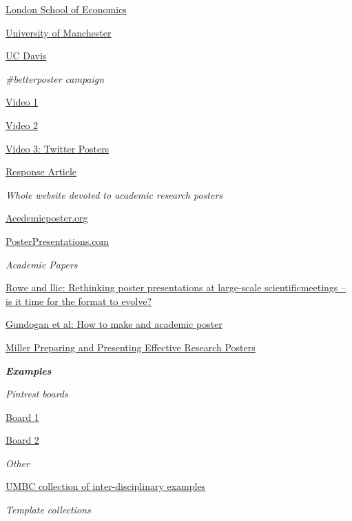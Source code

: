 \documentclass[
]{book}
\begin{document}
\href{https://blogs.lse.ac.uk/impactofsocialsciences/2018/05/11/how-to-design-an-award-winning-conference-poster/}{London School of Economics}

\href{http://www.supi.manchester.ac.uk/forteachers/academicposterguidance/}{University of Manchester}

\href{https://urc.ucdavis.edu/creating-effective-academic-posters}{UC Davis}

\emph{\#betterposter campaign}

\href{https://www.youtube.com/watch?v=1RwJbhkCA58\&t=2s\&ab_channel=MikeMorrison}{Video 1}

\href{https://www.youtube.com/watch?v=SYk29tnxASs\&ab_channel=MikeMorrison}{Video 2}

\href{https://www.youtube.com/watch?v=fQDL8r3r_d4\&ab_channel=MikeMorrison}{Video 3: Twitter Posters}

\href{https://www.insidehighered.com/news/2019/06/24/theres-movement-better-scientific-posters-are-they-really-better}{Response Article}

\emph{Whole website devoted to academic research posters}

\href{https://www.academicposter.org/}{Acedemicposter.org}

\href{https://www.posterpresentations.com/index.html}{PosterPresentations.com}

\emph{Academic Papers}

\href{https://febs.onlinelibrary.wiley.com/doi/epdf/10.1111/febs.13383}{Rowe and llic: Rethinking poster presentations at large-scale scientiﬁcmeetings -- is it time for the format to evolve?}

\href{https://www.sciencedirect.com/science/article/pii/S2049080116301303}{Gundogan et al: How to make and academic poster}

\href{https://www.ncbi.nlm.nih.gov/pmc/articles/PMC1955747/}{Miller Preparing and Presenting Effective Research Posters}

\textbf{\emph{Examples}}

\emph{Pintrest boards}

\href{https://www.pinterest.co.uk/jing4717/academic-poster/}{Board 1}

\href{https://www.pinterest.at/tzesire/conference-posters-design/}{Board 2}

\emph{Other}

\href{https://ur.umbc.edu/poster-presentation-examples/}{UMBC collection of inter-disciplinary examples}

\emph{Template collections}
\end{document}
